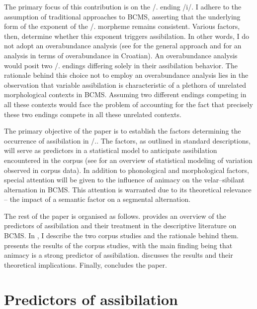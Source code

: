 \documentclass[output=paper,colorlinks,citecolor=brown]{langscibook}
\begin{document}
The primary focus of this contribution is on the {\DAT/\LOC.\SG} ending /i/. I adhere to the assumption of traditional approaches to BCMS, asserting that the underlying form of the exponent of the {\DAT/\LOC.\SG} morpheme remains consistent. Various factors, then, determine whether this exponent triggers assibilation. In other words, I do not adopt an overabundance analysis (see \citealt{thornton2019overabundance} for the general approach and \citealt{levcic2015morphological} for an analysis in terms of overabundance in Croatian). An overabundance analysis would posit two {\DAT/\LOC.\SG} endings differing solely in their assibilation behavior. The rationale behind this choice not to employ an overabundance analysis lies in the observation that variable assibilation is characteristic of a plethora of unrelated morphological contexts in BCMS. Assuming two different endings competing in all these contexts would face the problem of accounting for the fact that precisely these two endings compete in all these unrelated contexts.

The primary objective of the paper is to establish the factors determining the occurrence of assibilation in {\DAT/\LOC.\SG}. The factors, as outlined in standard descriptions, will serve as predictors in a statistical model to anticipate assibilation encountered in the corpus (see \citealt{lecic2016morphological} for an overview of statistical modeling of variation observed in corpus data). In addition to phonological and morphological factors, special attention will be given to the influence of animacy on the velar--sibilant alternation in BCMS. This attention is warranted due to its theoretical relevance -- the impact of a semantic factor on a segmental alternation.

The rest of the paper is organised as follows.  provides an overview of the predictors of assibilation and their treatment in the descriptive literature on BCMS. In , I describe the two corpus studies and the rationale behind them.  presents the results of the corpus studies, with the main finding being that animacy is a strong predictor of assibilation.  discusses the results and their theoretical implications. Finally,  concludes the paper.

\section{Predictors of assibilation}
\label{sim:sec:predictors}
\end{document}
